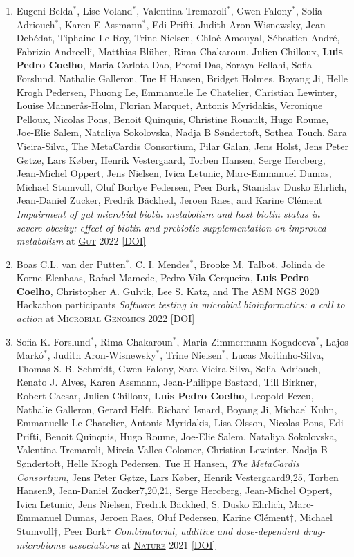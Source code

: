 \documentclass{article}
\newcommand\showdoi[1]{%
    \href{http://dx.doi.org/#1}{[DOI]}%
}
\newcommand\pubname[1]{\textsc{\uline{#1}}}
\newcommand\costar{${}^{*}$}
\newcommand\cosenior{†}
\begin{document}
\begin{enumerate}[resume]
\item Eugeni Belda\costar, Lise Voland\costar, Valentina Tremaroli\costar, Gwen Falony\costar, Solia Adriouch\costar, Karen E Assmann\costar, Edi Prifti, Judith Aron-Wisnewsky, Jean Debédat, Tiphaine Le Roy, Trine Nielsen, Chloé Amouyal, Sébastien André, Fabrizio Andreelli, Matthias Blüher, Rima Chakaroun, Julien Chilloux, \textbf{Luis Pedro Coelho}, Maria Carlota Dao, Promi Das, Soraya Fellahi, Sofia Forslund, Nathalie Galleron, Tue H Hansen, Bridget Holmes, Boyang Ji, Helle Krogh Pedersen, Phuong Le, Emmanuelle Le Chatelier, Christian Lewinter, Louise Mannerås-Holm, Florian Marquet, Antonis Myridakis, Veronique Pelloux, Nicolas Pons, Benoit Quinquis, Christine Rouault, Hugo Roume, Joe-Elie Salem, Nataliya Sokolovska, Nadja B Søndertoft, Sothea Touch, Sara Vieira-Silva, The MetaCardis Consortium, Pilar Galan, Jens Holst, Jens Peter Gøtze, Lars Køber, Henrik Vestergaard, Torben Hansen, Serge Hercberg, Jean-Michel Oppert, Jens Nielsen, Ivica Letunic, Marc-Emmanuel Dumas, Michael Stumvoll, Oluf Borbye Pedersen, Peer Bork, Stanislav Dusko Ehrlich, Jean-Daniel Zucker, Fredrik Bäckhed, Jeroen Raes, and Karine Clément \emph{Impairment of gut microbial biotin metabolism and host biotin status in severe obesity: effect of biotin and prebiotic supplementation on improved metabolism} at \pubname{Gut} 2022 \showdoi{10.1136/gutjnl-2021-325753}

\item Boas C.L. van der Putten\costar, C. I. Mendes\costar, Brooke M. Talbot, Jolinda de Korne-Elenbaas, Rafael Mamede, Pedro Vila-Cerqueira, \textbf{Luis Pedro Coelho},  Christopher A. Gulvik, Lee S. Katz, and The ASM NGS 2020 Hackathon participants \emph{Software testing in microbial bioinformatics: a call to action} at \pubname{Microbial Genomics} 2022 \showdoi{10.1099/mgen.0.000790}

\item Sofia K. Forslund\costar, Rima Chakaroun\costar, Maria
Zimmermann-Kogadeeva\costar, Lajos Markó\costar, Judith Aron-Wisnewsky\costar,
Trine Nielsen\costar, Lucas Moitinho-Silva, Thomas S. B.  Schmidt, Gwen Falony,
Sara Vieira-Silva, Solia Adriouch, Renato J. Alves, Karen Assmann,
Jean-Philippe Bastard, Till Birkner, Robert Caesar, Julien Chilloux,
\textbf{Luis Pedro Coelho}, Leopold Fezeu, Nathalie Galleron, Gerard Helft,
Richard Isnard, Boyang Ji, Michael Kuhn, Emmanuelle Le Chatelier, Antonis
Myridakis, Lisa Olsson, Nicolas Pons, Edi Prifti, Benoit Quinquis, Hugo Roume,
Joe-Elie Salem, Nataliya Sokolovska, Valentina Tremaroli, Mireia
Valles-Colomer, Christian Lewinter, Nadja B Søndertoft, Helle Krogh Pedersen,
Tue H Hansen, \textit{The MetaCardis Consortium}, Jens Peter Gøtze, Lars Køber,
Henrik Vestergaard9,25, Torben Hansen9, Jean-Daniel Zucker7,20,21, Serge
Hercberg, Jean-Michel Oppert, Ivica Letunic, Jens Nielsen, Fredrik Bäckhed, S.
Dusko Ehrlich, Marc-Emmanuel Dumas, Jeroen Raes, Oluf Pedersen, Karine
Clément\cosenior, Michael Stumvoll\cosenior, Peer Bork\cosenior
\emph{Combinatorial, additive and dose-dependent drug- microbiome associations}
at \pubname{Nature} 2021 \showdoi{10.1038/s41586-021-04177-9}


\end{enumerate}
\end{document}

